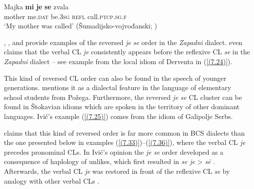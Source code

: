 \begin{exe}\ex\label{(7.113)}
\gll Majka  \textbf{mi}  \textbf{je}  \textbf{se}  zvala  \\
mother me.\textsc{dat}  be.3\textsc{sg}  \textsc{refl}  call.\textsc{ptcp.sg.f} \\
\glt ‘My mother was called’
\hfill  (Šumadijsko-vojvođanski; \citealt[136]{Okuka08})
\end{exe}

\noindent \citet[58]{Lisac03}, \citet[33]{Halilovic05}, and \citet[309]{Curkovic14} provide examples of the reversed \textit{je} \textit{se} order in the \textit{Zapadni} dialect. \citet[58]{Lisac03} even claims that the verbal CL \textit{je} consistently appears before the reflexive CL \textit{se} in the \textit{Zapadni} dialect – see example from the local idiom of Derventa in (\ref{(7.24)}).


\noindent This kind of reversed CL order can also be found in the speech of younger generations. \citet[165]{Aladrovic11} mentions it as a dialectal feature in the language of elementary school students from Požega. Furthermore, the reversed \textit{je se} CL cluster can be found in Štokavian idioms which are spoken in the territory of other dominant languages. Ivić’s example (\ref{(7.25)}) comes from the idiom of Galipolje Serbs.


\noindent \citet[395]{Ivic57} claims that this kind of reversed order is far more common in BCS dialects than the one presented below in examples (\ref{(7.33)})--(\ref{(7.36)}), where the verbal CL \textit{je} precedes pronominal CLs. In Ivić’s opinion the \textit{je se} order developed as a consequence of haplology of unlikes, which first resulted in \textit{se je} > \textit{sē} \citep[395]{Ivic57}. Afterwards, the verbal CL \textit{je} was restored in front of the reflexive CL \textit{se} by analogy with other verbal CLs \citep[cf.][395]{Ivic57}. 

